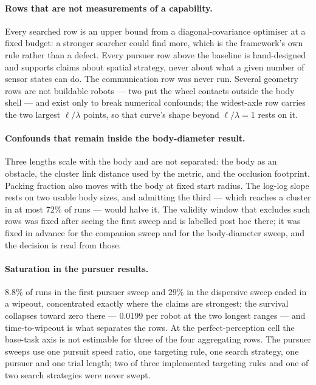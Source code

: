 \documentclass[11pt,a4paper]{article}
\begin{document}
\paragraph{Rows that are not measurements of a capability.}
Every searched row is an upper bound from a diagonal-covariance optimiser at a
fixed budget: a stronger searcher could find more, which is the framework's own
rule rather than a defect. Every pursuer row above the baseline is hand-designed
and supports claims about spatial strategy, never about what a given number of
sensor states can do. The communication row was never run. Several geometry rows
are not buildable robots --- two put the wheel contacts outside the body shell ---
and exist only to break numerical confounds; the widest-axle row carries the two
largest $\ell/\lambda$ points, so that curve's shape beyond $\ell/\lambda = 1$
rests on it.

\paragraph{Confounds that remain inside the body-diameter result.}
Three lengths scale with the body and are not separated: the body as an
obstacle, the cluster link distance used by the metric, and the occlusion
footprint. Packing fraction also moves with the body at fixed start radius. The
log-log slope rests on two usable body sizes, and admitting the third --- which
reaches a cluster in at most $72\%$ of runs --- would halve it. The validity
window that excludes such rows was fixed after seeing the first sweep and is
labelled post hoc there; it was fixed in advance for the companion sweep and for
the body-diameter sweep, and the decision is read from those.

\paragraph{Saturation in the pursuer results.}
$8.8\%$ of runs in the first pursuer sweep and $29\%$ in the dispersive sweep
ended in a wipeout, concentrated exactly where the claims are strongest; the
survival collapses toward zero there --- 0.0199 per robot at the two longest
ranges --- and time-to-wipeout is what separates the rows. At the perfect-perception cell the base-task axis is not
estimable for three of the four aggregating rows. The pursuer sweeps use one
pursuit speed ratio, one targeting rule, one search strategy, one pursuer and
one trial length; two of three implemented targeting rules and one of two search
strategies were never swept.
\end{document}
